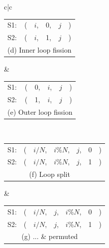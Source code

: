 \begin{figure}
\begin{tabular}{c|c}
    \begin{tabular}{l@{\hspace{4pt}}r@{\hspace{2pt}}c@{\hspace{2pt}}c@{\hspace{2pt}}c@{\hspace{0pt}}l}
    S1: & ( & $i$, & 0, & $j$ & ) \\
    S2: & ( & $i$, & 1, & $j$ & ) \\
    \multicolumn{6}{c}{ (d) Inner loop fission}
   \end{tabular} 
   & 
    \begin{tabular}{l@{\hspace{4pt}}r@{\hspace{2pt}}c@{\hspace{2pt}}c@{\hspace{2pt}}c@{\hspace{0pt}}l}
    S1: & ( & 0, & $i$, & $j$ & ) \\
    S2: & ( & 1, & $i$, & $j$ & ) \\
    \multicolumn{6}{c}{ (e) Outer loop fission}
   \end{tabular} \\\hline
   
    \begin{tabular}{l@{\hspace{4pt}}r@{\hspace{2pt}}c@{\hspace{2pt}}c@{\hspace{2pt}}c@{\hspace{2pt}}c@{\hspace{0pt}}l}
    S1: & (  & $i/N$, & $i\%N$, & $j$, & 0 & ) \\
    S2: & (  & $i/N$, & $i\%N$, & $j$, & 1 & ) \\
    \multicolumn{6}{c}{ (f) Loop split}
   \end{tabular} 
   &
    \begin{tabular}{l@{\hspace{4pt}}r@{\hspace{2pt}}c@{\hspace{2pt}}c@{\hspace{2pt}}c@{\hspace{2pt}}c@{\hspace{0pt}}l}
    S1: & ( & $i/N$, & $j$, & $i\%N$, & 0 & ) \\
    S2: & ( & $i/N$, & $j$, & $i\%N$, & 1 & ) \\
    \multicolumn{6}{c}{ (g) ... \& permuted}
    \end{tabular}  \\\hline
    

\end{tabular}
\end{figure}

